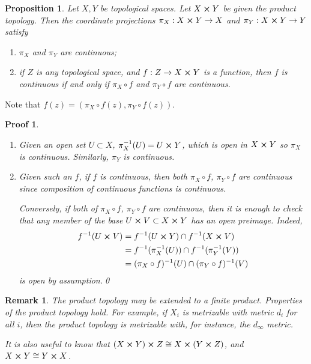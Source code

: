 \documentclass{article}
\theoremstyle{plain}\theoremheaderfont{\normalfont\itshape}\theorembodyfont{\rmfamily}\theoremseparator{.}\newtheorem*{rem}{Remark}\newtheorem*{ex}{Example}\newtheorem*{proof}{Proof}\newtheorem*{altp}{Alternative proof}
\theoremstyle{plain}\theoremheaderfont{\normalfont\bfseries}\theorembodyfont{\rmfamily}\theoremseparator{.}\newtheorem{thm}{Theorem}[section]\newtheorem{lem}[thm]{Lemma}\newtheorem{prop}[thm]{Proposition}\newtheorem*{cor}{Corollary}\newtheorem{defn}[thm]{Definition}\newtheorem{clm}[thm]{Claim}\newtheorem{clminproof}{Claim}
\theoremstyle{break}\theoremheaderfont{\normalfont\itshape}\theorembodyfont{\rmfamily}\theoremseparator{.\medskip}\newtheorem*{proofskip}{Proof}\newtheorem*{exs}{Examples}\newtheorem*{rems}{Remarks}
\theoremstyle{break}\theoremheaderfont{\normalfont\bfseries}\theorembodyfont{\rmfamily}\theoremseparator{.\medskip}\newtheorem{lemskip}[thm]{Lemma}\newtheorem{defnskip}[thm]{Definition}\newtheorem{propskip}[thm]{Proposition}\newtheorem{thmskip}[thm]{Theorem}
\newcommand{\qed}{\hfill\ensuremath{\Box}}
\begin{document}
    \begin{prop}
        Let \(X,Y\) be topological spaces. Let \(X\cross Y\) be given the product topology. Then the coordinate projections \(\pi_X:X\cross Y\to X\) and \(\pi_Y:X\cross Y\to Y\) satisfy
        \begin{enumerate}[label=(\roman*),topsep=0pt]
            \item \(\pi_X\) and \(\pi_Y\) are continuous;
            \item if \(Z\) is any topological space, and \(f:Z\to X\cross Y\) is a function, then \(f\) is continuous if and only if \(\pi_X\circ f\) and \(\pi_Y\circ f\) are continuous.
        \end{enumerate}
    \end{prop}
    Note that \(f(z)=(\pi_X\circ f(z),\pi_Y\circ f(z))\).
    \begin{proofskip}
        \begin{enumerate}[label=(\roman*),topsep=0pt]
            \item Given an open set \(U\subset X\), \(\pi^{-1}_X(U)=U\cross Y\), which is open in \(X\cross Y\) so \(\pi_X\) is continuous. Similarly, \(\pi_Y\) is continuous.
            \item Given such an \(f\), if \(f\) is continuous, then both \(\pi_X\circ f\), \(\pi_Y\circ f\) are continuous since composition of continuous functions is continuous.
            
            Conversely, if both of \(\pi_X\circ f\), \(\pi_Y\circ f\) are continuous, then it is enough to check that any member of the base \(U\cross V\subset X\cross Y\) has an open preimage. Indeed,
            \begin{align*}
                f^{-1}(U\cross V)&=f^{-1}(U\cross Y)\cap f^{-1}(X\cross V)\\
                &=f^{-1}(\pi_X^{-1}(U))\cap f^{-1}(\pi_Y^{-1}(V))\\
                &=(\pi_X\circ f)^{-1}(U)\cap(\pi_Y\circ f)^{-1}(V)
            \end{align*}
            is open by assumption.\qed
        \end{enumerate}
    \end{proofskip}
    \begin{rem}
        The product topology may be extended to a finite product. Properties of the product topology hold. For example, if \(X_i\) is metrizable with metric \(d_i\) for all \(i\), then the product topology is metrizable with, for instance, the \(d_\infty\) metric.

        It is also useful to know that \((X\cross Y)\cross Z\cong X\cross(Y\cross Z)\), and \(X\cross Y\cong Y\cross X\).
    \end{rem}
\end{document}
